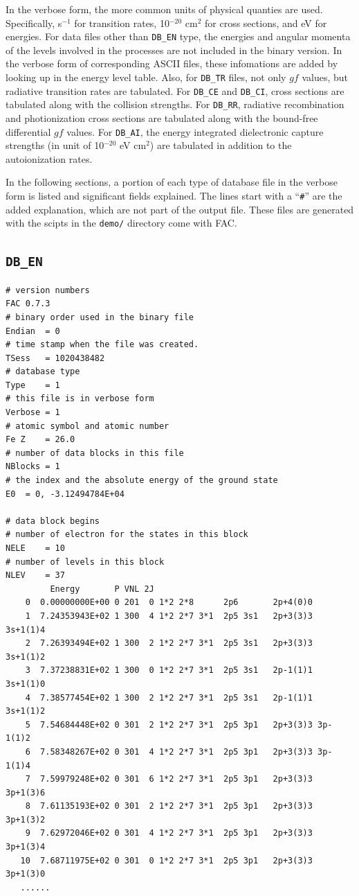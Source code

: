 \documentclass[twoside,letterpaper]{refrep}
\begin{document}
In the verbose form, the more common units of physical quanties are
used. Specifically, s$^{-1}$ for transition rates, 10$^{-20}$ cm$^2$ for cross
sections, and eV for energies. For data files other than \texttt{DB\_EN} type,
the energies and angular momenta of the levels involved in the processes are
not included in the binary version. In the verbose form of corresponding ASCII
files, these infomations are added by looking up in the energy level
table. Also, for \texttt{DB\_TR} files, not only $gf$ values, but radiative
transition rates are tabulated. For \texttt{DB\_CE} and \texttt{DB\_CI}, cross
sections are tabulated along with the collision strengths. For \texttt{DB\_RR},
radiative recombination and photionization cross sections are tabulated along
with the bound-free differential $gf$ values. For \texttt{DB\_AI}, the energy
integrated dielectronic capture strengths (in unit of 10$^{-20}$ eV cm$^2$)
are tabulated in addition to the autoionization rates.

In the following sections, a portion of each type of database file in the
verbose form is listed and significant fields explained. The lines start with
a ``\verb|#|'' are the added explanation, which are not part of the output
file. These files are generated with the scipts in the \texttt{demo/}
directory come with FAC.

\subsection{\texttt{DB\_EN}}
\begin{verbatim}
# version numbers
FAC 0.7.3
# binary order used in the binary file
Endian	= 0
# time stamp when the file was created.
TSess	= 1020438482
# database type
Type	= 1
# this file is in verbose form
Verbose	= 1
# atomic symbol and atomic number
Fe Z	= 26.0
# number of data blocks in this file
NBlocks	= 1
# the index and the absolute energy of the ground state
E0	= 0, -3.12494784E+04

# data block begins
# number of electron for the states in this block
NELE	= 10
# number of levels in this block
NLEV	= 37
         Energy       P VNL 2J
    0  0.00000000E+00 0 201  0 1*2 2*8      2p6       2p+4(0)0 
    1  7.24353943E+02 1 300  4 1*2 2*7 3*1  2p5 3s1   2p+3(3)3 3s+1(1)4 
    2  7.26393494E+02 1 300  2 1*2 2*7 3*1  2p5 3s1   2p+3(3)3 3s+1(1)2 
    3  7.37238831E+02 1 300  0 1*2 2*7 3*1  2p5 3s1   2p-1(1)1 3s+1(1)0 
    4  7.38577454E+02 1 300  2 1*2 2*7 3*1  2p5 3s1   2p-1(1)1 3s+1(1)2 
    5  7.54684448E+02 0 301  2 1*2 2*7 3*1  2p5 3p1   2p+3(3)3 3p-1(1)2 
    6  7.58348267E+02 0 301  4 1*2 2*7 3*1  2p5 3p1   2p+3(3)3 3p-1(1)4 
    7  7.59979248E+02 0 301  6 1*2 2*7 3*1  2p5 3p1   2p+3(3)3 3p+1(3)6 
    8  7.61135193E+02 0 301  2 1*2 2*7 3*1  2p5 3p1   2p+3(3)3 3p+1(3)2 
    9  7.62972046E+02 0 301  4 1*2 2*7 3*1  2p5 3p1   2p+3(3)3 3p+1(3)4 
   10  7.68711975E+02 0 301  0 1*2 2*7 3*1  2p5 3p1   2p+3(3)3 3p+1(3)0 
   ......
\end{verbatim}
\end{document}
